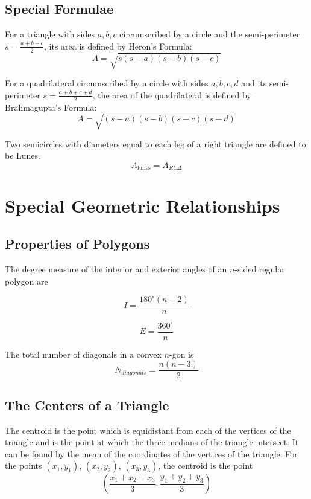 \documentclass[final, letterpaper, 12pt]{article}
\begin{document}
	\subsection{Special Formulae}\label{sec: Heron's and Brahmagupta's Formulae, Lunes}
	
		For a triangle with sides $a, b, c$ circumscribed by a circle and the semi-perimeter $s = \frac{a+b+c}{2}$, its area is defined by Heron's Formula:
		\begin{equation}
			A = \sqrt{s(s-a)(s-b)(s-c)}
		\end{equation}
		
		For a quadrilateral circumscribed by a circle with sides $a, b, c, d$ and its semi-perimeter $s = \frac{a+b+c+d}{2}$, the area of the quadrilateral is defined by Brahmagupta's Formula:
		\begin{equation}
			A = \sqrt{(s-a)(s-b)(s-c)(s-d)}
		\end{equation}
		
		Two semicircles with diameters equal to each leg of a right triangle are defined to be Lunes.
		\begin{equation}
			A_\text{lunes} = A_{Rt.\Delta}
		\end{equation}
		
\section{Special Geometric Relationships}
	\subsection{Properties of Polygons}\label{sec: information about angles, diagonals, and other aspects of polygons}
	The degree measure of the interior and exterior angles of an $n$-sided regular polygon are
	
		\begin{equation}
			I = \frac{180^{\circ}(n-2)}{n}
		\end{equation}
		
		\begin{equation}
			E = \frac{360^{\circ}}{n}
		\end{equation}
		
	The total number of diagonals in a convex $n$-gon is
	\begin{equation}
			N_{diagonals} = \frac {n(n-3)}{2}
		\end{equation}
	
	\subsection{The Centers of a Triangle}\label{sec: looking at the centroid, orthocenter, circumcenter, and incenter of a triangle}
		The centroid is the point which is equidistant from each of the vertices of the triangle and is the point at which the three medians of the triangle intersect. It can be found by the mean of the coordinates of the vertices of the triangle. For the points $(x_1, y_1)$, $(x_2, y_2)$, $(x_3, y_3)$, the centroid is the point
		\begin{equation}
			\left(\frac{x_1 + x_2 + x_3}{3}, \frac{y_1 + y_2 + y_3}{3} \right)
		\end{equation}
		
\end{document}
